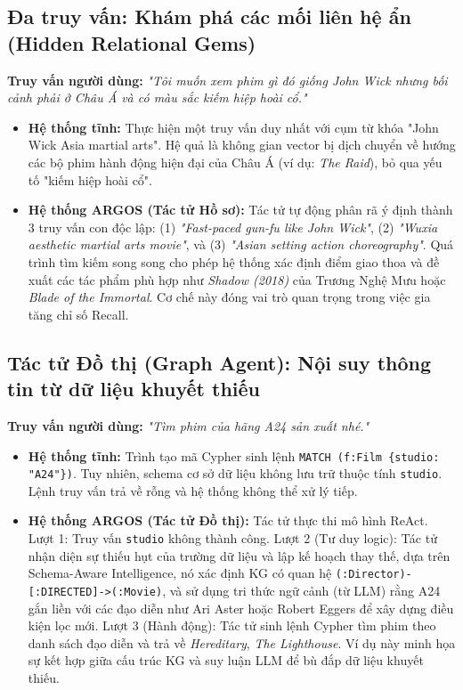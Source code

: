 \subsection{Đa truy vấn: Khám phá các mối liên hệ ẩn (Hidden Relational Gems)}
\textbf{Truy vấn người dùng:} \textit{"Tôi muốn xem phim gì đó giống John Wick nhưng bối cảnh phải ở Châu Á và có màu sắc kiếm hiệp hoài cổ."}
\begin{itemize}
    \item \textbf{Hệ thống tĩnh:} Thực hiện một truy vấn duy nhất với cụm từ khóa "John Wick Asia martial arts". Hệ quả là không gian vector bị dịch chuyển về hướng các bộ phim hành động hiện đại của Châu Á (ví dụ: \textit{The Raid}), bỏ qua yếu tố "kiếm hiệp hoài cổ".
    \item \textbf{Hệ thống ARGOS (Tác tử Hồ sơ):} Tác tử tự động phân rã ý định thành 3 truy vấn con độc lập: (1) \textit{"Fast-paced gun-fu like John Wick"}, (2) \textit{"Wuxia aesthetic martial arts movie"}, và (3) \textit{"Asian setting action choreography"}. Quá trình tìm kiếm song song cho phép hệ thống xác định điểm giao thoa và đề xuất các tác phẩm phù hợp như \textit{Shadow (2018)} của Trương Nghệ Mưu hoặc \textit{Blade of the Immortal}. Cơ chế này đóng vai trò quan trọng trong việc gia tăng chỉ số Recall.
\end{itemize}

\subsection{Tác tử Đồ thị (Graph Agent): Nội suy thông tin từ dữ liệu khuyết thiếu}
\textbf{Truy vấn người dùng:} \textit{"Tìm phim của hãng A24 sản xuất nhé."}
\begin{itemize}
    \item \textbf{Hệ thống tĩnh:} Trình tạo mã Cypher sinh lệnh \texttt{MATCH (f:Film \{studio: "A24"\})}. Tuy nhiên, schema cơ sở dữ liệu không lưu trữ thuộc tính \texttt{studio}. Lệnh truy vấn trả về rỗng và hệ thống không thể xử lý tiếp.
    \item \textbf{Hệ thống ARGOS (Tác tử Đồ thị):} Tác tử thực thi mô hình ReAct. Lượt 1: Truy vấn \texttt{studio} không thành công. Lượt 2 (Tư duy logic): Tác tử nhận diện sự thiếu hụt của trường dữ liệu và lập kế hoạch thay thế, dựa trên Schema-Aware Intelligence, nó xác định KG có quan hệ \texttt{(:Director)-[:DIRECTED]->(:Movie)}, và sử dụng tri thức ngữ cảnh (từ LLM) rằng A24 gắn liền với các đạo diễn như Ari Aster hoặc Robert Eggers để xây dựng điều kiện lọc mới. Lượt 3 (Hành động): Tác tử sinh lệnh Cypher tìm phim theo danh sách đạo diễn và trả về \textit{Hereditary}, \textit{The Lighthouse}. Ví dụ này minh họa sự kết hợp giữa cấu trúc KG và suy luận LLM để bù đắp dữ liệu khuyết thiếu.
\end{itemize}

